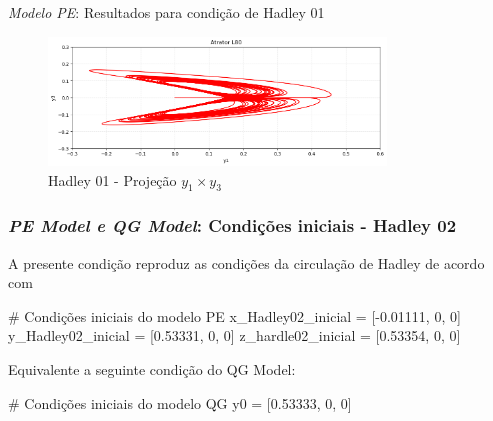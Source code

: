 
\begin{frame}{\textit{Modelo PE}: Resultados para condição de Hadley 01}
	\begin{figure}
		\centering
		\includegraphics[width=0.8\textwidth]{img/p02y1y3.png}
		\caption{Hadley 01 - Projeção $y_1 \times y_3$}
		\label{fig:p02y1y3}
	\end{figure}
\end{frame}


\begin{frame}[fragile]
	
	\frametitle{\textit{PE Model e QG Model}: Condições iniciais - Hadley 02}
	A presente condição reproduz as condições da circulação de Hadley de acordo com \cite{lorenz1980}
	\begin{python}
# Condições iniciais do modelo PE
x_Hadley02_inicial = [-0.01111, 0, 0]
y_Hadley02_inicial = [0.53331, 0, 0]
z_hardle02_inicial = [0.53354, 0, 0]
	\end{python}
	
	Equivalente a seguinte condição do QG Model:
	\begin{python}
# Condições iniciais do modelo QG
y0 = [0.53333, 0, 0]
	\end{python}
\end{frame}


